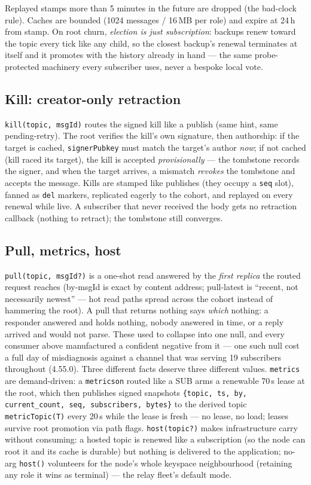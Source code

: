 \documentclass[nobib]{tufte-handout}
\begin{document}
Replayed stamps more than 5 minutes in the future are dropped (the
bad-clock rule). Caches are bounded (1024 messages / 16\,MB per role)
and expire at 24\,h from stamp. On root churn, \emph{election is just
subscription}: backups renew toward the topic every tick like any
child, so the closest backup's renewal terminates at itself and it
promotes with the history already in hand --- the same probe-protected
machinery every subscriber uses, never a bespoke local vote.

\subsection{Kill: creator-only retraction}

\texttt{kill(topic, msgId)} routes the signed kill like a publish (same
hint, same pending-retry). The root verifies the kill's own signature,
then authorship: if the target is cached, \texttt{signerPubkey} must
match the target's author \emph{now}; if not cached (kill raced its
target), the kill is accepted \emph{provisionally} --- the tombstone
records the signer, and when the target arrives, a mismatch
\emph{revokes} the tombstone and accepts the message. Kills are stamped
like publishes (they occupy a \texttt{seq} slot), fanned as
\texttt{del} markers, replicated eagerly to the cohort, and replayed on
every renewal while live. A subscriber that never received the body gets
no retraction callback (nothing to retract); the tombstone still
converges.

\subsection{Pull, metrics, host}

\texttt{pull(topic, msgId?)} is a one-shot read answered by the
\emph{first replica} the routed request reaches (by-msgId is exact by
content address; pull-latest is ``recent, not necessarily newest'' ---
hot read paths spread across the cohort instead of hammering the root).
A pull that returns nothing says \emph{which} nothing: a responder
answered and holds nothing, nobody answered in time, or a reply arrived
and would not parse. These used to collapse into one null, and every
consumer above manufactured a confident negative from it --- one such
null cost a full day of misdiagnosis against a channel that was serving
19 subscribers throughout (4.55.0). Three different facts deserve three
different values. \texttt{metrics} are demand-driven: a
\texttt{metricson} routed like a SUB arms a renewable 70\,s lease at
the root, which then publishes signed snapshots
\texttt{\{topic, ts, by, current\_count, seq, subscribers, bytes\}} to
the derived topic \texttt{metricTopic(T)} every 20\,s while the lease is
fresh --- no lease, no load; leases survive root promotion via path
flags. \texttt{host(topic?)} makes infrastructure carry without
consuming: a hosted topic is renewed like a subscription (so the node
can root it and its cache is durable) but nothing is delivered to the
application; no-arg \texttt{host()} volunteers for the node's whole
keyspace neighbourhood (retaining any role it wins as terminal) --- the
relay fleet's default mode.
\end{document}
